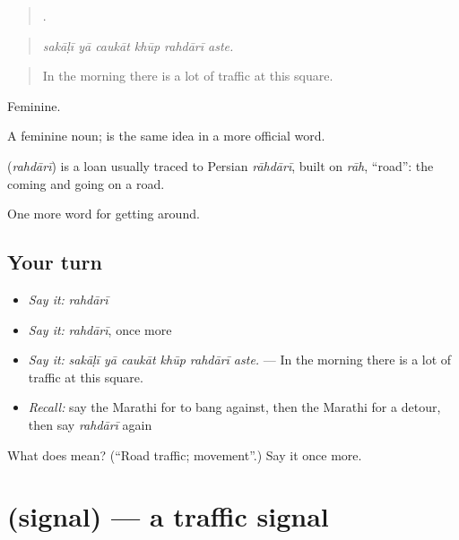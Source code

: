 \begin{quote}
     .
\end{quote}

\begin{quote}
\emph{sakāḷī yā caukāt khūp rahdārī aste.}
\end{quote}

\begin{quote}
In the morning there is a lot of traffic at this square.
\end{quote}

Feminine.

A feminine noun;  is the same idea in a more official word.

\begin{cousinweb}
\textbf{} (\emph{rahdārī}) is a loan usually traced to Persian \emph{rāhdārī}, built on \emph{rāh}, \textquotedblleft{}road\textquotedblright{}: the coming and going on a road.
\end{cousinweb}

\begin{grammarlens}[title={What you've built}]
One more word for getting around.
\end{grammarlens}

\subsection*{Your turn}
\begin{itemize}
\raggedright
  \item \emph{Say it:} \emph{rahdārī}
  \item \emph{Say it:} \emph{rahdārī}, once more
  \item \emph{Say it:} \emph{sakāḷī yā caukāt khūp rahdārī aste.} — In the morning there is a lot of traffic at this square.
  \item \emph{Recall:} say the Marathi for to bang against, then the Marathi for a detour, then say \emph{rahdārī} again
\end{itemize}

\begin{tcolorbox}[breakable,colback=teal!4,colframe=teal!35!black,title={Before you move on}]
What does  mean? (\textquotedblleft{}Road traffic; movement\textquotedblright{}.) Say it once more.
\end{tcolorbox}
\section[\texorpdfstring{\mr{सिग्नल} (signal)}{सिग्नल (signal)}]{ (signal) — a traffic signal}

